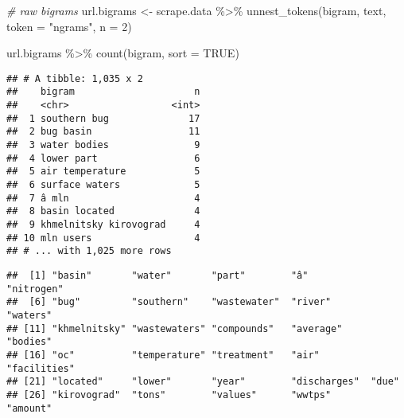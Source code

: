 \documentclass[
]{article}
\newenvironment{Shaded}{\begin{snugshade}}{\end{snugshade}}
\newcommand{\AttributeTok}[1]{\textcolor[rgb]{0.77,0.63,0.00}{#1}}
\newcommand{\CommentTok}[1]{\textcolor[rgb]{0.56,0.35,0.01}{\textit{#1}}}
\newcommand{\ConstantTok}[1]{\textcolor[rgb]{0.00,0.00,0.00}{#1}}
\newcommand{\DecValTok}[1]{\textcolor[rgb]{0.00,0.00,0.81}{#1}}
\newcommand{\FunctionTok}[1]{\textcolor[rgb]{0.00,0.00,0.00}{#1}}
\newcommand{\NormalTok}[1]{#1}
\newcommand{\OtherTok}[1]{\textcolor[rgb]{0.56,0.35,0.01}{#1}}
\newcommand{\SpecialCharTok}[1]{\textcolor[rgb]{0.00,0.00,0.00}{#1}}
\newcommand{\StringTok}[1]{\textcolor[rgb]{0.31,0.60,0.02}{#1}}
\begin{document}
\begin{Shaded}
\begin{Highlighting}[]
\CommentTok{\# raw bigrams}
\NormalTok{url.bigrams }\OtherTok{\textless{}{-}}\NormalTok{ scrape.data }\SpecialCharTok{\%\textgreater{}\%}
  \FunctionTok{unnest\_tokens}\NormalTok{(bigram, text, }\AttributeTok{token =} \StringTok{"ngrams"}\NormalTok{, }\AttributeTok{n =} \DecValTok{2}\NormalTok{)}

\NormalTok{url.bigrams }\SpecialCharTok{\%\textgreater{}\%}
  \FunctionTok{count}\NormalTok{(bigram, }\AttributeTok{sort =} \ConstantTok{TRUE}\NormalTok{)}
\end{Highlighting}
\end{Shaded}

\begin{verbatim}
## # A tibble: 1,035 x 2
##    bigram                     n
##    <chr>                  <int>
##  1 southern bug              17
##  2 bug basin                 11
##  3 water bodies               9
##  4 lower part                 6
##  5 air temperature            5
##  6 surface waters             5
##  7 â mln                      4
##  8 basin located              4
##  9 khmelnitsky kirovograd     4
## 10 mln users                  4
## # ... with 1,025 more rows
\end{verbatim}

\begin{Shaded}
\end{Shaded}

\begin{verbatim}
##  [1] "basin"       "water"       "part"        "â"           "nitrogen"   
##  [6] "bug"         "southern"    "wastewater"  "river"       "waters"     
## [11] "khmelnitsky" "wastewaters" "compounds"   "average"     "bodies"     
## [16] "oc"          "temperature" "treatment"   "air"         "facilities" 
## [21] "located"     "lower"       "year"        "discharges"  "due"        
## [26] "kirovograd"  "tons"        "values"      "wwtps"       "amount"
\end{verbatim}
\end{document}
